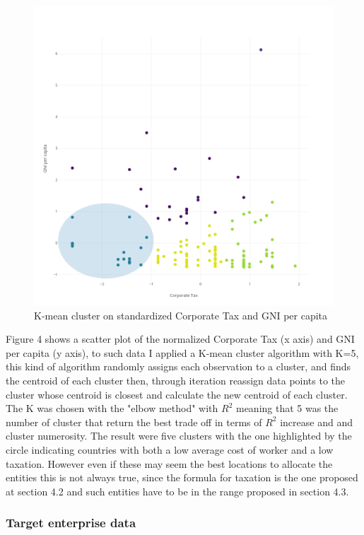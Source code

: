 \documentclass{article}
\begin{document}
\begin{figure}[ht]
\centering
\includegraphics[width=0.8\linewidth]{Images/Cluster-GNI-CT.png}
\caption{K-mean cluster on standardized Corporate Tax and GNI per capita}
\end{figure}

Figure 4 shows a scatter plot of the normalized Corporate Tax (x axis) and GNI per capita (y axis), to such data I applied a K-mean cluster algorithm with K=5, this kind of algorithm randomly assigns each observation to a cluster, and finds the centroid of each cluster then, through iteration reassign data points to the cluster whose centroid is closest and calculate the new centroid of each cluster. The K was chosen with the "elbow method" with $R^2$ meaning that 5 was the number of cluster that return the best trade off in terms of $R^2$ increase and and cluster numerosity.
The result were five clusters with the one highlighted by the circle indicating countries with both a low average cost of worker and a low taxation. However even if these may seem the best locations to allocate the entities this is not always true, since the formula for taxation is the one proposed at section 4.2 and such entities have to be in the range proposed in section 4.3.

\subsubsection{Target enterprise data}
\end{document}

